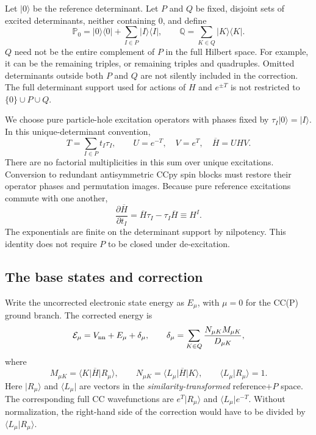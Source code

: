 \documentclass[11pt,letterpaper]{article}
\numberwithin{equation}{section}
\newcommand{\ket}[1]{\lvert #1\rangle}
\newcommand{\bra}[1]{\langle #1\rvert}
\newcommand{\me}[3]{\langle #1\rvert #2\lvert #3\rangle}
\newcommand{\bH}{\overline H}
\newcommand{\Pzero}{\mathbb P_0}
\newcommand{\Qproj}{\mathbb Q}
\begin{document}
Let $\ket{0}$ be the reference determinant. Let $P$ and $Q$ be fixed, disjoint
sets of excited determinants, neither containing $0$, and define
\begin{equation}
 \Pzero=\ket{0}\bra{0}+\sum_{I\in P}\ket{I}\bra{I},\qquad
 \Qproj=\sum_{K\in Q}\ket{K}\bra{K}.
 \label{eq:projectors}
\end{equation}
$Q$ need not be the entire complement of $P$ in the full Hilbert space.
For example, it can be the remaining triples, or remaining triples and
quadruples. Omitted determinants outside both $P$ and $Q$ are not silently
included in the correction. The full determinant support used for actions
of $H$ and $e^{\pm T}$ is not restricted to $\{0\}\cup P\cup Q$.

We choose pure particle-hole excitation operators with phases fixed by
$\tau_I\ket{0}=\ket{I}$. In this unique-determinant convention,
\begin{equation}
 T=\sum_{I\in P}t_I\tau_I,\qquad U=e^{-T},\quad V=e^T,\quad
 \bH=UHV.
 \label{eq:similarity}
\end{equation}
There are no factorial multiplicities in this sum over unique excitations.
Conversion to redundant antisymmetric CCpy spin blocks must restore their
operator phases and permutation images. Because pure reference excitations
commute with one another,
\begin{equation}
 \frac{\partial\bH}{\partial t_I}
   =\bH\tau_I-\tau_I\bH\equiv H^{I}.
 \label{eq:commutator}
\end{equation}
The exponentials are finite on the determinant support by nilpotency. This
identity does not require $P$ to be closed under de-excitation.

\subsection{The base states and correction}
Write the uncorrected electronic state energy as $E_\mu$, with $\mu=0$ for
the CC(P) ground branch. The corrected energy is
\begin{equation}
 \mathcal E_\mu=V_{\rm nn}+E_\mu+\delta_\mu,\qquad
 \delta_\mu=\sum_{K\in Q}\frac{N_{\mu K}M_{\mu K}}{D_{\mu K}},
 \label{eq:energy}
\end{equation}
where
\begin{equation}
 M_{\mu K}=\me{K}{\bH}{R_\mu},\qquad
 N_{\mu K}=\me{L_\mu}{\bH}{K},\qquad
 \langle L_\mu\vert R_\mu\rangle=1.
 \label{eq:moments}
\end{equation}
Here $\ket{R_\mu}$ and $\bra{L_\mu}$ are vectors in the
\emph{similarity-transformed} reference+$P$ space. The corresponding full
CC wavefunctions are $e^T\ket{R_\mu}$ and $\bra{L_\mu}e^{-T}$.
Without normalization, the right-hand side of the correction would have to
be divided by $\langle L_\mu\vert R_\mu\rangle$.
\end{document}
